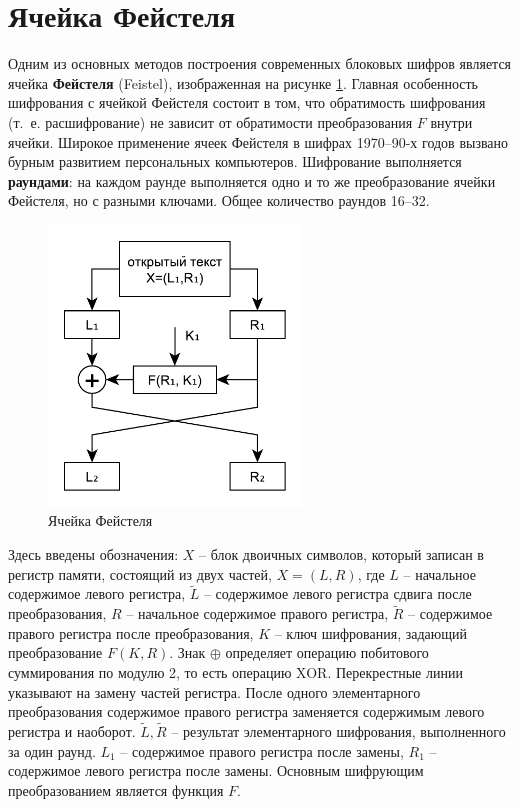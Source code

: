 \section{Ячейка Фейстеля}

Одним из основных методов построения современных блоковых шифров является ячейка \textbf{Фейстеля} (Feistel), изображенная на рисунке \ref{fig:Feistel}. Главная особенность шифрования с ячейкой Фейстеля состоит в том, что обратимость шифрования (т.~е. расшифрование) не зависит от обратимости преобразования $F$ внутри ячейки. Широкое применение ячеек Фейстеля в шифрах 1970--90-х годов вызвано бурным развитием персональных компьютеров. Шифрование выполняется \textbf{раундами}: на каждом раунде выполняется одно и то же преобразование ячейки Фейстеля, но с разными ключами. Общее количество раундов 16--32.

\begin{figure}[!ht]
    \centering
    \includegraphics[width=0.6\textwidth]{pic/feistel}
    \caption{Ячейка Фейстеля\label{fig:Feistel}}
\end{figure}

Здесь введены обозначения: $X$ -- блок двоичных символов, который записан в регистр памяти, состоящий из двух частей, $X = (L,R)$, где $L$ -- начальное содержимое левого регистра, $\tilde{L}$ -- содержимое левого регистра сдвига после преобразования, $R$ -- начальное содержимое правого регистра, $\tilde{R}$ -- содержимое правого регистра после преобразования, $K$ -- ключ шифрования, задающий преобразование $F(K,R)$. Знак $\oplus$ определяет операцию побитового суммирования по модулю 2, то есть операцию XOR. Перекрестные линии указывают на замену частей регистра. После одного элементарного преобразования содержимое правого регистра заменяется содержимым левого регистра и наоборот. $\tilde{L},\tilde{R}$ -- результат элементарного шифрования, выполненного за один раунд. $L_{1}$ -- содержимое правого регистра после замены, $R_{1}$ -- содержимое левого регистра после замены. Основным шифрующим преобразованием является функция $F$.

